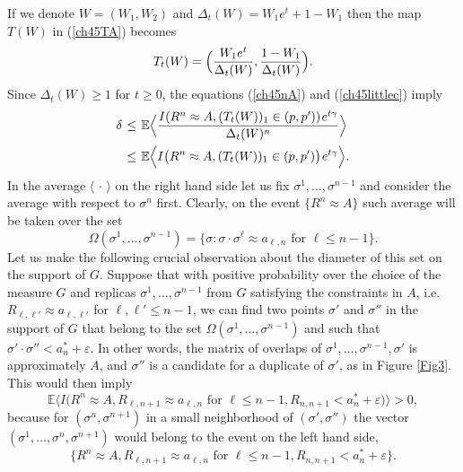 \documentclass[12pt]{article}
\newcommand{\eps}{{\varepsilon}}
\newcommand{\smsp}{\hspace{0.3mm}}
\newcommand{\e}{\mathbb{E}}
\newcommand{\la}{\langle}
\newcommand{\ra}{\rangle}
\theoremstyle{nonumberplain}
\begin{document}
If we denote $W=(W_1,W_2)$ and $\Delta_t(W) =W_1 e^t + 1-W_1$ then the map $T(W)$ in (\ref{ch45TA}) becomes
\begin{equation}
T_t(W) = \Bigl(\frac{W_1 e^t}{\Delta_t(W) }, \frac{1-W_1}{\Delta_t(W)} \Bigr).
\label{ch45TtW}
\end{equation}
Since $\Delta_t(W)\geq 1$ for $t\geq 0$, the equations (\ref{ch45nA}) and (\ref{ch45littlec}) imply
\begin{align}
\delta 
& \smsp\leq\smsp 
\e\Bigl\la
\frac{I(R^n\approx A, (T_t(W))_1\in (p,p')) \smsp  e^{ t\gamma} }
{ \Delta_t(W)^n}
\Bigr\ra
\nonumber
\\
& \smsp\leq\smsp 
\e\Bigl\la
I\bigl(R^n\approx A, (T_t(W))_1\in (p,p') \bigr)  \smsp e^{ t\gamma} 
\Bigr\ra.
\label{ch45littlec2}
\end{align}
In the average $\la\,\cdot\,\ra$ on the right hand side let us fix $\sigma^1,\ldots, \sigma^{n-1}$ and consider
the average with respect to $\sigma^n$ first. Clearly, on the event $\{R^n\approx A\}$ such average will be taken over the set
\begin{equation}
\Omega(\sigma^1,\ldots,\sigma^{n-1}) = \bigl\{\sigma: \sigma\cdot \sigma^{\ell} \approx a_{\ell,n} \mbox{ for }\ell\leq n-1\bigr\}.
\label{ch45Omega}
\end{equation}
Let us make the following crucial observation about the diameter of this set on the support of $G$. Suppose that with positive probability over the choice of the measure $G$ and replicas  $\sigma^1,\ldots, \sigma^{n-1}$ from $G$ satisfying the constraints in $A$, i.e. $R_{\ell,\ell'}\approx a_{\ell,\ell'}$ for $\ell,\ell'\leq n-1$,  we can find two points $\sigma'$ and $\sigma''$ in the support of $G$ that belong to the set $\Omega(\sigma^1,\ldots,\sigma^{n-1})$ and such that  $\sigma'\cdot \sigma'' < a_n^* + \eps.$ In other words, the matrix of overlaps of $\sigma^1,\ldots,\sigma^{n-1},\sigma'$ is approximately $A$, and $\sigma''$ is a candidate for a duplicate of $\sigma'$, as in Figure \ref{Fig3}. This would then imply
\begin{equation}
\e\bigl\la
I \bigl(
R^n\approx A, R_{\ell,n+1} \approx a_{\ell,n} \mbox{ for }\ell\leq n-1, R_{n,n+1} < a_n^* +\eps
\bigr)
\bigr\ra
>0,
\label{ch45extendAG}
\end{equation}
because for $(\sigma^n,\sigma^{n+1})$ in a small neighborhood of $(\sigma',\sigma'')$ the vector 
$(\sigma^1,\ldots,\sigma^n,\sigma^{n+1})$ would belong to the event on the left hand side,
$$
\bigl\{
R^n\approx A, R_{\ell,n+1} \approx a_{\ell,n} \mbox{ for }\ell\leq n-1, R_{n,n+1} < a_n^* +\eps
\bigr\}.
$$
\end{document}
